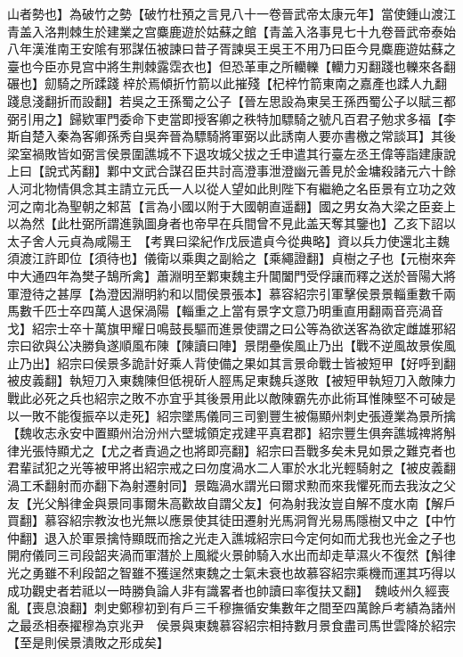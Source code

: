 山者勢也】為破竹之勢【破竹杜預之言見八十一卷晉武帝太康元年】當使鍾山渡江青盖入洛荆棘生於建業之宫麋鹿遊於姑蘇之館【青盖入洛事見七十九卷晉武帝泰始八年漢淮南王安隂有邪謀伍被諫曰昔子胥諫吳王吳王不用乃曰臣今見麋鹿遊姑蘇之臺也今臣亦見宫中將生荆棘露霑衣也】但恐革車之所轥轢【轥力刃翻踐也轢來各翻碾也】劎騎之所蹂踐梓於焉傾折竹箭以此摧殘【杞梓竹箭東南之嘉產也蹂人九翻踐息淺翻折而設翻】若吳之王孫蜀之公子【晉左思設為東吴王孫西蜀公子以賦三都弼引用之】歸欵軍門委命下吏當即授客卿之秩特加驃騎之號凡百君子勉求多福【李斯自楚入秦為客卿孫秀自吳奔晉為驃騎將軍弼以此誘南人要亦書檄之常談耳】其後梁室禍敗皆如弼言侯景圍譙城不下退攻城父拔之壬申遣其行臺左丞王偉等詣建康說上曰【說式芮翻】鄴中文武合謀召臣共討高澄事泄澄幽元善見於金墉殺諸元六十餘人河北物情俱念其主請立元氏一人以從人望如此則陛下有繼絶之名臣景有立功之效河之南北為聖朝之邾莒【言為小國以附于大國朝直遥翻】國之男女為大梁之臣妾上以為然【此杜弼所謂進孰圖身者也帝早在兵間曾不見此盖天奪其鑒也】乙亥下詔以太子舍人元貞為咸陽王　【考異曰梁紀作戊辰遣貞今從典略】資以兵力使還北主魏須渡江許即位【須待也】儀衛以乘輿之副給之【乘繩證翻】貞樹之子也【元樹來奔中大通四年為樊子鵠所禽】蕭淵明至鄴東魏主升閶闔門受俘讓而釋之送於晉陽大將軍澄待之甚厚【為澄因淵明約和以間侯景張本】慕容紹宗引軍擊侯景景輜重數千兩馬數千匹士卒四萬人退保渦陽【輜重之上當有景字文意乃明重直用翻兩音亮渦音戈】紹宗士卒十萬旗甲耀日鳴鼓長驅而進景使謂之曰公等為欲送客為欲定雌雄邪紹宗曰欲與公决勝負遂順風布陳【陳讀曰陣】景閉壘俟風止乃出【戰不逆風故景俟風止乃出】紹宗曰侯景多詭計好乘人背使備之果如其言景命戰士皆被短甲【好呼到翻被皮義翻】執短刀入東魏陳但低視斫人脛馬足東魏兵遂敗【被短甲執短刀入敵陳力戰此必死之兵也紹宗之敗不亦宜乎其後景用此以敵陳霸先亦此術耳惟陳堅不可破是以一敗不能復振卒以走死】紹宗墜馬儀同三司劉豐生被傷顯州刺史張遵業為景所擒【魏收志永安中置顯州治汾州六壁城領定戎建平真君郡】紹宗豐生俱奔譙城禆將斛律光張恃顯尤之【尤之者責過之也將即亮翻】紹宗曰吾戰多矣未見如景之難克者也君輩試犯之光等被甲將出紹宗戒之曰勿度渦水二人軍於水北光輕騎射之【被皮義翻渦工禾翻射而亦翻下為射遷射同】景臨渦水謂光曰爾求勲而來我懼死而去我汝之父友【光父斛律金與景同事爾朱高歡故自謂父友】何為射我汝豈自解不度水南【解戶買翻】慕容紹宗教汝也光無以應景使其徒田遷射光馬洞胷光易馬隱樹又中之【中竹仲翻】退入於軍景擒恃顯既而捨之光走入譙城紹宗曰今定何如而尤我也光金之子也開府儀同三司段韶夹渦而軍潛於上風縱火景帥騎入水出而却走草濕火不復然【斛律光之勇雖不利段韶之智雖不獲逞然東魏之士氣未衰也故慕容紹宗乘機而運其巧得以成功觀史者若祗以一時勝負論人非有識畧者也帥讀曰率復扶又翻】　魏岐州久經喪亂【喪息浪翻】刺史鄭穆初到有戶三千穆撫循安集數年之間至四萬餘戶考績為諸州之最丞相泰擢穆為京兆尹　侯景與東魏慕容紹宗相持數月景食盡司馬世雲降於紹宗【至是則侯景潰敗之形成矣】


